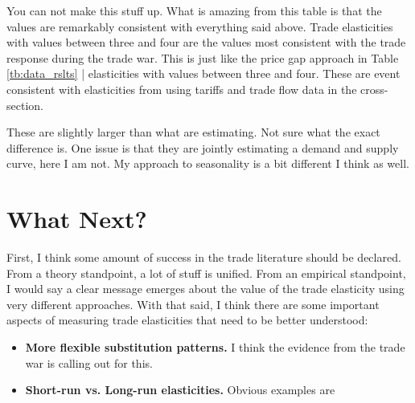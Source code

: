 \documentclass[pdftex,12pt]{article}
\begin{document}
You can not make this stuff up. What is amazing from this table is that the values are remarkably consistent with everything said above. Trade elasticities with values between three and four are the values most consistent with the trade response during the trade war. This is just like the price gap approach in Table \ref{tb:data_rslts} | elasticities with values between three and four. These are event consistent with elasticities from using tariffs and trade flow data in the cross-section.

These are slightly larger than what \citet{fajgelbaum2019return} are estimating. Not sure what the exact difference is. One issue is that they are jointly estimating a demand and supply curve, here I am not. My approach to seasonality is a bit different I think as well.

\section{What Next?}

First, I think some amount of success in the trade literature should be declared. From a theory standpoint, a lot of stuff is unified. From an empirical standpoint, I would say a clear message emerges about the value of the trade elasticity using very different approaches. With that said, I think there are some important aspects of measuring trade elasticities that need to be better understood:
\begin{itemize}
\item \textbf{More flexible substitution patterns.} I think the evidence from the trade war is calling out for this.

\item \textbf{Short-run vs. Long-run elasticities.} Obvious examples are \citet{ruhl2008}
\end{itemize}

\newpage

\small

\end{document}
